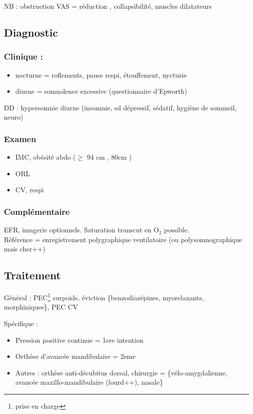 \documentclass{article}
\begin{document}
NB : obstruction VAS = réduction \diameter, \nearrow{} collapsibilité,
\searrow{} muscles dilatateurs
\subsection{Diagnostic}
\subsubsection{Clinique :}
\begin{itemize}
  \item nocturne = roflements, pause respi, étouffement, nycturie
  \item diurne = somnolence excessive (questionnaire d'Epworth)
\end{itemize}
DD : hypersomnie diurne (insomnie, sd dépressif, sédatif, hygiène de sommeil,
neuro)
\subsubsection{Examen}
\begin{itemize}
  \item IMC, obésité abdo (\(\ge\) 94 cm \male, 80cm \female)
  \item ORL
  \item CV, respi
\end{itemize}
\subsubsection{Complémentaire}
EFR, imagerie optionnels.
Saturation transcut en O\(_{\text{2}}\) possible.\\
Référence = enregistrement polygraphique ventilatoire (ou polysomnographique
mais cher++)
\subsection{Traitement}
Général : PEC\footnote{prise en charge} surpoids, éviction \{benzodiazépines,
myorelaxants, morphiniques\}, PEC CV

Spécifique :
\begin{itemize}
  \item Pression positive continue = 1ere intention
  \item Orthèse d'avancée mandibulaire = 2eme
  \item Autres : orthèse anti-décubitus dorsal, chirurgie = \{vélo-amygdalienne,
    avancée maxillo-mandibulaire (lourd++), nasale\}
\end{itemize}
\end{document}
